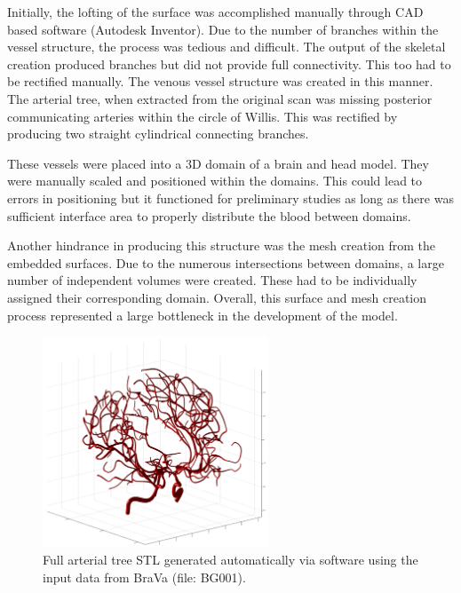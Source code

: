 \documentclass[11pt,english,a4paper,twoside,openright]{report}
\begin{document}
{{{{{{{{Initially, the lofting of the surface was accomplished manually through CAD based software (Autodesk Inventor). Due to the number of branches within the vessel structure, the process was tedious and difficult. The output of the skeletal creation produced branches but did not provide full connectivity. This too had to be rectified manually. The venous vessel structure was created in this manner. The arterial tree, when extracted from the original scan was missing posterior communicating arteries within the circle of Willis. This was rectified by producing two straight cylindrical connecting branches.

These vessels were placed into a 3D domain of a brain and head model. They were manually scaled and positioned within the domains. This could lead to errors in positioning but it functioned for preliminary studies as long as there was sufficient interface area to properly distribute the blood between domains.

Another hindrance in producing this structure was the mesh creation from the embedded surfaces. Due to the numerous intersections between domains, a large number of independent volumes were created. These had to be individually assigned their corresponding domain. Overall, this surface and mesh creation process represented a large bottleneck in the development of the model.

\begin{figure}[h]
	\centering
	\includegraphics[width=0.6\textwidth]{3DFullVessels/arteries3D1}
	\caption[Full arterial tree STL generated automatically via software using the input data from BraVa (file: BG001)]{Full arterial tree STL generated automatically via software using the input data from BraVa (file: BG001).}
	\label{fig:3Darteries}
\end{figure}	

}}}}}}}}
\end{document}
